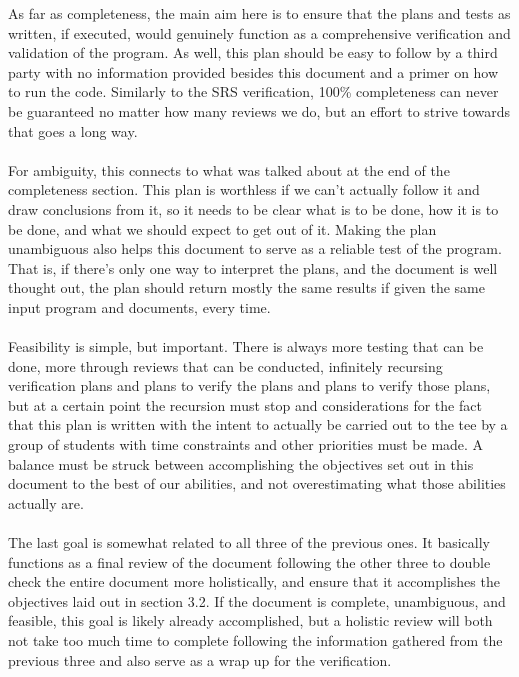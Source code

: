 \documentclass[12pt, titlepage]{article}
\begin{document}
As far as completeness, the main aim here is to ensure that the plans and tests as written, if executed,
would genuinely function as a comprehensive verification and validation of the program. As well, this plan should be easy to follow by a third party with no information
provided besides this document and a primer on how to run the code. Similarly to the SRS verification, 100\% completeness can never be guaranteed no matter how many
reviews we do, but an effort to strive towards that goes a long way.\\\\ For ambiguity, this connects to what was talked about at the end of the completeness section. 
This plan is worthless if we can’t actually follow it and draw conclusions from it, so it needs to be clear what is to be done, how it is to be done, and what we should expect
to get out of it. Making the plan unambiguous also helps this document to serve as a reliable test of the program. That is, if there’s only one way to interpret the plans, 
and the document is well thought out, the plan should return mostly the same results if given the same input program and documents, every time.\\\\
Feasibility is simple, but important. There is always more testing that can be done, more through reviews that can be conducted, infinitely recursing verification plans
and plans to verify the plans and plans to verify those plans, but at a certain point the recursion must stop and considerations for the fact that this plan is written
with the intent to actually be carried out to the tee by a group of students with time constraints and other priorities must be made. A balance must be struck between
accomplishing the objectives set out in this document to the best of our abilities, and not overestimating what those abilities actually are.\\\\ The last goal is somewhat
related to all three of the previous ones. It basically functions as a final review of the document following the other three to double check the entire document more
holistically, and ensure that it accomplishes the objectives laid out in section 3.2. If the document is complete, unambiguous, and feasible, 
this goal is likely already accomplished, but a holistic review will both not take too much time to complete following the information gathered from the previous three
and also serve as a wrap up for the verification.
\end{document}

